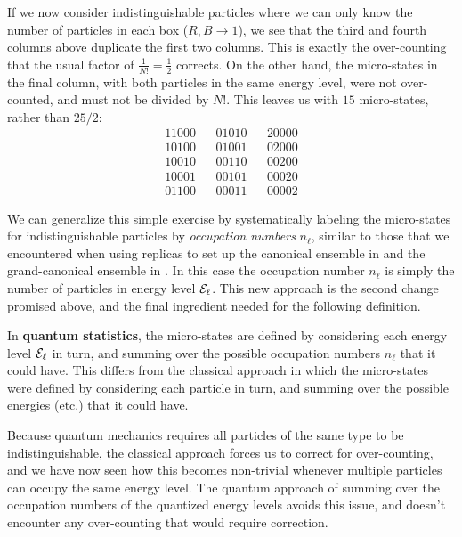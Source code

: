 If we now consider indistinguishable particles where we can only know the number of particles in each box ($R, B \to 1$), we see that the third and fourth columns above duplicate the first two columns.
This is exactly the over-counting that the usual factor of $\frac{1}{N!} = \frac{1}{2}$ corrects.
On the other hand, the micro-states in the final column, with both particles in the same energy level, were not over-counted, and must not be divided by $N!$.
This leaves us with $15$ micro-states, rather than $25/2$:
\begin{align*}
  11000 & & 01010 & & 20000 \\
  10100 & & 01001 & & 02000 \\
  10010 & & 00110 & & 00200 \\
  10001 & & 00101 & & 00020 \\
  01100 & & 00011 & & 00002
\end{align*}

We can generalize this simple exercise by systematically labeling the micro-states for indistinguishable particles by \textit{occupation numbers} $n_{\ell}$, similar to those that we encountered when using replicas to set up the canonical ensemble in  and the grand-canonical ensemble in .
In this case the occupation number $n_{\ell}$ is simply the number of particles in energy level $\mathcal E_{\ell}$.
This new approach is the second change promised above, and the final ingredient needed for the following definition.

\begin{shaded}
  In \textbf{quantum statistics}, the micro-states are defined by considering each energy level $\mathcal E_{\ell}$ in turn, and summing over the possible occupation numbers $n_{\ell}$ that it could have.
  This differs from the classical approach in which the micro-states were defined by considering each particle in turn, and summing over the possible energies (etc.) that it could have.
\end{shaded}

Because quantum mechanics requires all particles of the same type to be indistinguishable, the classical approach forces us to correct for over-counting, and we have now seen how this becomes non-trivial whenever multiple particles can occupy the same energy level.
The quantum approach of summing over the occupation numbers of the quantized energy levels avoids this issue, and doesn't encounter any over-counting that would require correction.



